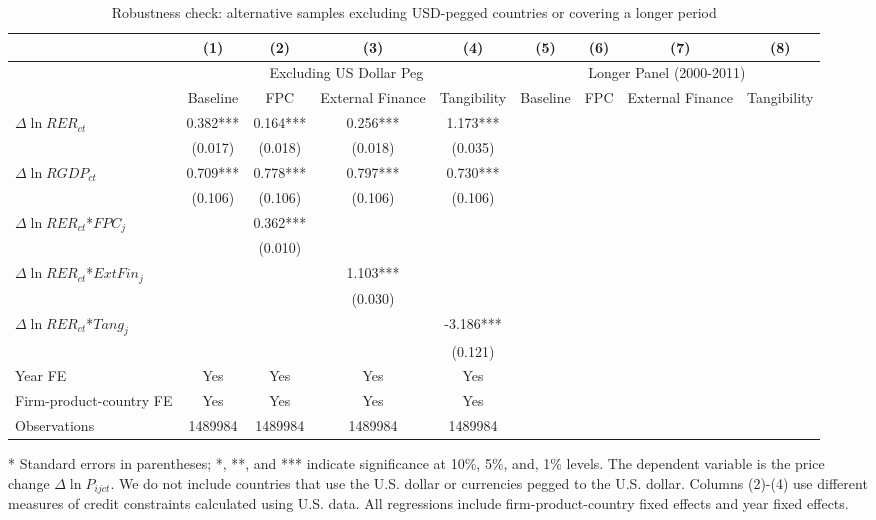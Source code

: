 \documentclass[12pt]{article}
\begin{document}
\begin{table}
	\centering
	\caption{Robustness check: alternative samples excluding USD-pegged countries or covering a longer period}
	\begin{threeparttable}
	\begin{tabular}{lcccccccc}
		\toprule
		& (1)   & (2)   & (3)   & (4) & (5)   & (6)   & (7)   & (8)\\
		\midrule
		& \multicolumn{4}{c}{Excluding US Dollar Peg} & \multicolumn{4}{c}{Longer Panel (2000-2011)}\\
		& Baseline & FPC   & External Finance & Tangibility & Baseline & FPC   & External Finance & Tangibility \\
		\midrule
		$\Delta \ln RER_{ct}$ & 0.382*** & 0.164*** & 0.256*** & 1.173*** &&&&\\
		& (0.017) & (0.018) & (0.018) & (0.035) &&&&\\
		$\Delta \ln RGDP_{ct}$ & 0.709*** & 0.778*** & 0.797*** & 0.730*** &&&&\\
		& (0.106) & (0.106) & (0.106) & (0.106) &&&&\\
		$\Delta \ln RER_{ct}$*$FPC_{j}$ &       & 0.362*** &       &  &&&& \\
		&       & (0.010) &       &  &&&&\\
		$\Delta \ln RER_{ct}$*$ExtFin_{j}$ &       &       & 1.103*** &  &&&&\\
		&       &       & (0.030) &  &&&&\\
		$\Delta \ln RER_{ct}$*$Tang_{j}$ &       &       &       & -3.186*** &&&&\\
		&       &       &       & (0.121) &&&&\\
		Year FE  &   Yes    & Yes   & Yes   & Yes &&&&\\
		Firm-product-country FE &   Yes    & Yes   & Yes   & Yes &&&&\\
		Observations & 1489984 & 1489984 & 1489984 & 1489984 &&&&\\
		\bottomrule
	\end{tabular}
	\begin{tablenotes}
		\footnotesize
		\item[*] Standard errors in parentheses; *, **, and *** indicate significance at 10\%, 5\%, and, 1\% levels. The dependent variable is the price change $\Delta \ln P_{ijct}$. We do not include countries that use the U.S. dollar or currencies pegged to the U.S. dollar. Columns (2)-(4) use different measures of credit constraints calculated using U.S. data. All regressions include firm-product-country fixed effects and year fixed effects.
	\end{tablenotes}
        \end{threeparttable}
        \label{tab.robust.nopeg}
\end{table}
\end{document}
